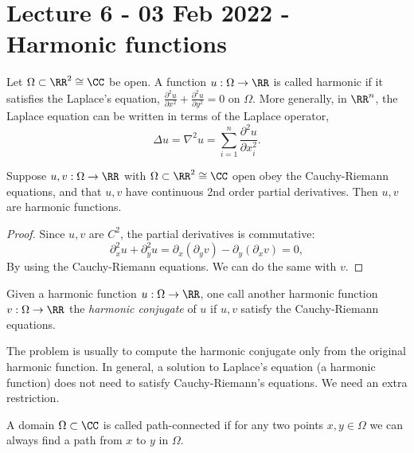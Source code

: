 \section{Lecture 6 - 03 Feb 2022 - Harmonic functions}
\begin{definition}
  Let $\Omega\subset\RR^2\cong \CC$ be open. A function $u:\Omega\to\RR$ is
  called harmonic if it satisfies the Laplace's equation, $\frac{\partial^2 u
  }{\partial x^2} + \frac{\partial^2 u}{\partial y^2} =0$ on $\Omega$. More
  generally, in $\RR^n$, the Laplace equation can be written in terms of the
  Laplace operator,
  \[\Delta u = \nabla^2 u = \sum_{i=1}^n \frac{\partial^2 u}{\partial x_i^2}.\]
  \label{def:harmonicFunction}
\end{definition}

\begin{theorem}
  Suppose $u,v:\Omega\to\RR$ with $\Omega\subset\RR^2\cong\CC$ open obey the
  Cauchy-Riemann equations, and that $u,v$ have continuous 2nd order partial
  derivatives. Then $u,v$ are harmonic functions.
\end{theorem}
\begin{proof}
  Since $u,v$ are $C^2$, the partial derivatives is commutative:
  \[\partial_x^2 u+ \partial_y^2 u = \partial_x(\partial_y v) -
  \partial_y(\partial_x v) =0,\]
  By using the Cauchy-Riemann equations. We can do the same with $v$.
\end{proof}

\begin{definition}
  Given a harmonic function $u:\Omega\to\RR$, one call another harmonic function
  $v:\Omega\to\RR$ the \emph{harmonic conjugate} of $u$ if $u,v$ satisfy the
  Cauchy-Riemann equations.
  \label{def:harmonicConj}
\end{definition}
\begin{remark}
  The problem is usually to compute the harmonic conjugate only from the
  original harmonic function. In general, a solution to Laplace's equation (a
  harmonic function) does not need to satisfy Cauchy-Riemann's equations. We
  need an extra restriction.
\end{remark}
\begin{definition}
  A domain $\Omega\subset\CC$ is called path-connected if for any two points
  $x,y\in\Omega$ we can always find a path from $x$ to $y$ in $\Omega$.
\end{definition}

